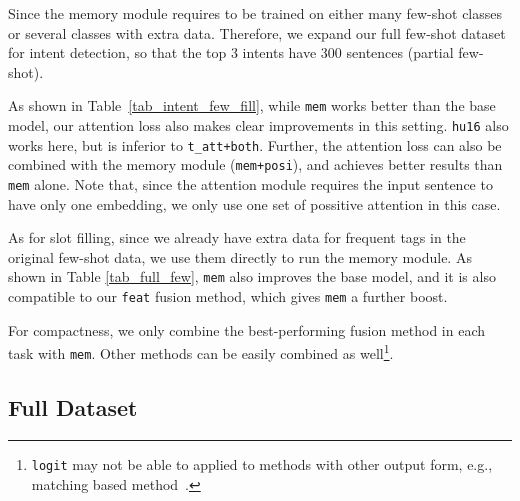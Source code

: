Since the memory module requires to be trained on either many few-shot classes or several classes with extra data.
Therefore, we expand our full few-shot dataset for intent detection, so that the top 3 intents have 300 sentences (partial few-shot).

As shown in Table~\ref{tab_intent_few_fill}, while \texttt{mem} works better than the base model, our attention loss also makes clear improvements in this setting.
\texttt{hu16} also works here, but is inferior to \texttt{t\_att+both}.
Further, the attention loss can also be combined with the memory module (\texttt{mem+posi}), and achieves better results than \texttt{mem} alone.
Note that, since the attention module requires the input sentence to have only one embedding, we only use one set of possitive attention in this case.

As for slot filling, since we already have extra data for frequent tags in the original few-shot data, we use them directly to run the memory module. As shown in Table \ref{tab_full_few}, \texttt{mem} also improves the base model, and it is also compatible to our \texttt{feat} fusion method, which gives \texttt{mem} a further boost.

For compactness, we only combine the best-performing fusion method in each task with \texttt{mem}. Other methods can be easily combined as well\footnote{
\texttt{logit} may not be able to applied to methods with other output form, e.g., matching based method~\cite{koch2015siamese}.}.



\subsection{Full Dataset}

